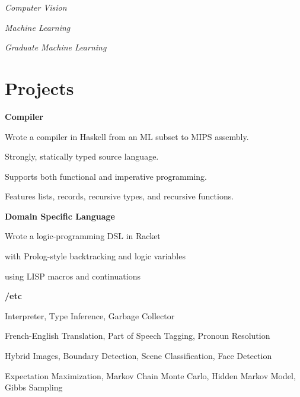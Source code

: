 \documentclass[margin,line]{resume}
\begin{document}
\begin{resume}
        \textsl{Computer Vision}	\par\vspace{-4mm}%
    {\addtolength{\leftskip}{2 mm}  
    \par}
    
        \textsl{Machine Learning}	\par\vspace{-4mm}%
    {\addtolength{\leftskip}{2 mm} 						
    \par}
   
       \textsl{Graduate Machine Learning}	\par\vspace{-1mm}%
    {\addtolength{\leftskip}{2 mm} 						
    \par}
    \section{\mysidestyle{} Projects}

    \textbf{Compiler} 			\par\vspace{-4.0mm}%
      {\addtolength{\leftskip}{2 mm}
	Wrote a compiler in Haskell from an ML subset to MIPS assembly. 
	\begin{list2}
	 \item Strongly, statically typed source language.
	 \item Supports both functional and imperative programming.
	 \item Features lists, records, recursive types, and recursive functions.	
	\end{list2}
      \par}

    \textbf{Domain Specific Language} 	\par\vspace{-4.0mm}%
      {\addtolength{\leftskip}{2 mm}
      Wrote a logic-programming DSL in Racket
      	\begin{list2}
	 \item with Prolog-style backtracking and logic variables
	 \item using LISP macros and continuations
	\end{list2}
      \par}      

      \textbf{/etc} 	\par 
      {\addtolength{\leftskip}{2 mm}
  	\begin{list2}
	  \item Interpreter, Type Inference, Garbage Collector
	  \item French-English Translation, Part of Speech Tagging, Pronoun Resolution
	  \item Hybrid Images, Boundary Detection, Scene Classification, Face Detection
  	  \item Expectation Maximization, Markov Chain Monte Carlo, Hidden Markov Model, Gibbs Sampling
      	\end{list2}
      \par}      


\end{resume}
\end{document}
